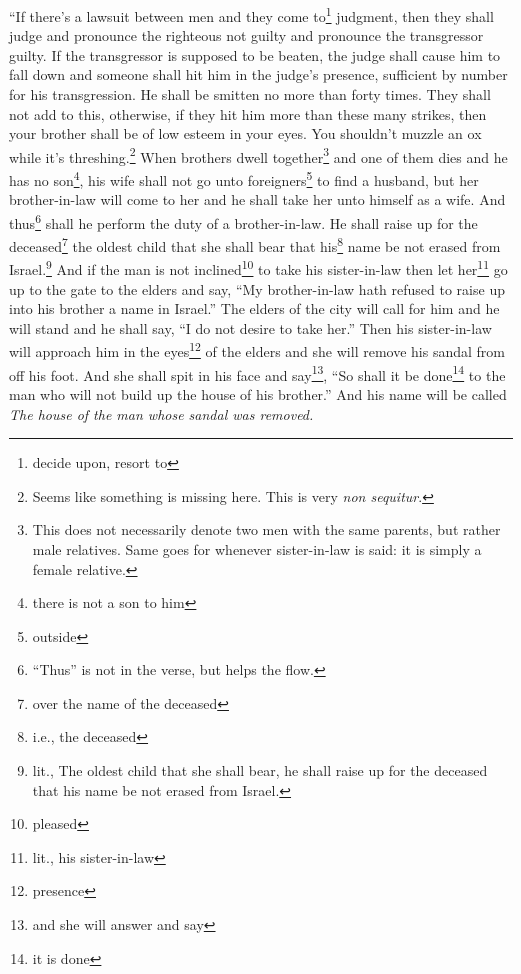 
\begin{inparaenum}
     ``If there's a lawsuit between men and they come to\footnote{decide upon, resort to} judgment, then they shall judge and pronounce the righteous not guilty and pronounce the transgressor guilty.%
     If the transgressor is supposed to be beaten, the judge shall cause him to fall down and someone shall hit him in the judge's presence, sufficient by number for his transgression.%
     He shall be smitten no more than forty times. They shall not add to this, otherwise, if they hit him more than these many strikes, then your brother shall be of low esteem in your eyes.%
     You shouldn't muzzle an ox while it's threshing.\footnote{Seems like something is missing here. This is very \textit{non sequitur}.}%
     When brothers dwell together\footnote{This does not necessarily denote two men with the same parents, but rather male relatives. Same goes for whenever sister-in-law is said: it is simply a female relative.} and one of them dies and he has no son\footnote{there is not a son to him}, his wife shall not go unto foreigners\footnote{outside} to find a husband, but her brother-in-law will come to her and he shall take her unto himself as a wife. And thus\footnote{``Thus'' is not in the verse, but helps the flow.} shall he perform the duty of a brother-in-law.%
     He shall raise up for the deceased\footnote{over the name of the deceased} the oldest child that she shall bear that his\footnote{i.e., the deceased} name be not erased from Israel.\footnote{lit., The oldest child that she shall bear, he shall raise up for the deceased that his name be not erased from Israel.}%
     And if the man is not inclined\footnote{pleased} to take his sister-in-law then let her\footnote{lit., his sister-in-law} go up to the gate to the elders and say, ``My brother-in-law hath refused to raise up into his brother a name in Israel.''%
     The elders of the city will call for him and he will stand and he shall say, ``I do not desire to take her.''%
     Then his sister-in-law will approach him in the eyes\footnote{presence} of the elders and she will remove his sandal from off his foot. And she shall spit in his face and say\footnote{and she will answer and say}, ``So shall it be done\footnote{it is done} to the man who will not build up the house of his brother.''%
     And his name will be called \textit{The house of the man whose sandal was removed.}%

\end{inparaenum}
